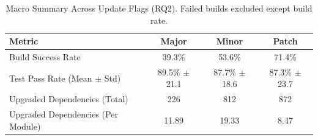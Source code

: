 \begin{table}[htbp]
\centering
\caption{Macro Summary Across Update Flags (RQ2). Failed builds excluded except build rate.}
\label{tab:rq2_macro_summary}
\begin{tabular}{lccc}
\toprule
\textbf{Metric} & \textbf{Major} & \textbf{Minor} & \textbf{Patch} \\
\midrule
Build Success Rate & 39.3\% & 53.6\% & 71.4\% \\
Test Pass Rate (Mean $\pm$ Std) & 89.5\% $\pm$ 21.1 & 87.7\% $\pm$ 18.6 & 87.3\% $\pm$ 23.7 \\
Upgraded Dependencies (Total) & 226 & 812 & 872 \\
Upgraded Dependencies (Per Module) & 11.89 & 19.33 & 8.47 \\
\bottomrule
\end{tabular}
\end{table}
